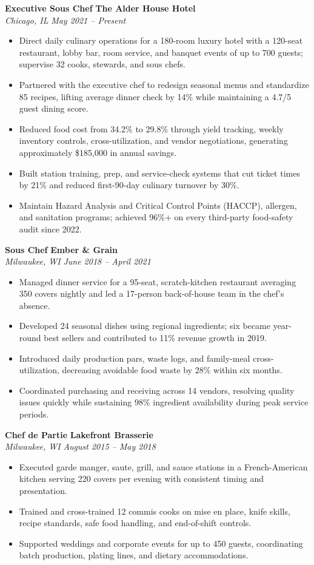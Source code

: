 \documentclass[10pt,letterpaper]{article}
\newcommand{\role}[4]{%
  \textbf{#1} \hfill \textbf{#2}\\[-0.08em]
  \textit{#3} \hfill \textit{#4}\par
}
\begin{document}
\role{Executive Sous Chef}{The Alder House Hotel}{Chicago, IL}{May 2021 -- Present}
\begin{itemize}
  \item Direct daily culinary operations for a 180-room luxury hotel with a 120-seat restaurant, lobby bar, room service, and banquet events of up to 700 guests; supervise 32 cooks, stewards, and sous chefs.
  \item Partnered with the executive chef to redesign seasonal menus and standardize 85 recipes, lifting average dinner check by 14\% while maintaining a 4.7/5 guest dining score.
  \item Reduced food cost from 34.2\% to 29.8\% through yield tracking, weekly inventory controls, cross-utilization, and vendor negotiations, generating approximately \$185,000 in annual savings.
  \item Built station training, prep, and service-check systems that cut ticket times by 21\% and reduced first-90-day culinary turnover by 30\%.
  \item Maintain Hazard Analysis and Critical Control Points (HACCP), allergen, and sanitation programs; achieved 96\%+ on every third-party food-safety audit since 2022.
\end{itemize}

\role{Sous Chef}{Ember \& Grain}{Milwaukee, WI}{June 2018 -- April 2021}
\begin{itemize}
  \item Managed dinner service for a 95-seat, scratch-kitchen restaurant averaging 350 covers nightly and led a 17-person back-of-house team in the chef's absence.
  \item Developed 24 seasonal dishes using regional ingredients; six became year-round best sellers and contributed to 11\% revenue growth in 2019.
  \item Introduced daily production pars, waste logs, and family-meal cross-utilization, decreasing avoidable food waste by 28\% within six months.
  \item Coordinated purchasing and receiving across 14 vendors, resolving quality issues quickly while sustaining 98\% ingredient availability during peak service periods.
\end{itemize}

\role{Chef de Partie}{Lakefront Brasserie}{Milwaukee, WI}{August 2015 -- May 2018}
\begin{itemize}
  \item Executed garde manger, saute, grill, and sauce stations in a French-American kitchen serving 220 covers per evening with consistent timing and presentation.
  \item Trained and cross-trained 12 commis cooks on mise en place, knife skills, recipe standards, safe food handling, and end-of-shift controls.
  \item Supported weddings and corporate events for up to 450 guests, coordinating batch production, plating lines, and dietary accommodations.
\end{itemize}
\end{document}

